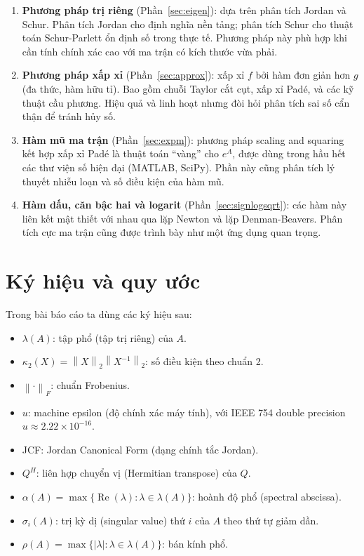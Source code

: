 \documentclass[12pt,a4paper]{report}
\newcommand{\norm}[1]{\left\lVert #1 \right\rVert}
\DeclareMathOperator{\re}{Re}
\begin{document}
\begin{enumerate}[label=\roman*.]
  \item \textbf{Phương pháp trị riêng} (Phần~\ref{sec:eigen}): dựa trên phân tích
    Jordan và Schur. Phân tích Jordan cho định nghĩa nền tảng; phân tích Schur
    cho thuật toán Schur-Parlett ổn định số trong thực tế. Phương pháp này phù hợp
    khi cần tính chính xác cao với ma trận có kích thước vừa phải.

  \item \textbf{Phương pháp xấp xỉ} (Phần~\ref{sec:approx}): xấp xỉ $f$ bởi hàm
    đơn giản hơn $g$ (đa thức, hàm hữu tỉ). Bao gồm chuỗi Taylor cắt cụt, xấp xỉ
    Padé, và các kỹ thuật cầu phương. Hiệu quả và linh hoạt nhưng đòi hỏi phân tích
    sai số cẩn thận để tránh hủy số.

  \item \textbf{Hàm mũ ma trận} (Phần~\ref{sec:expm}): phương pháp scaling and
    squaring kết hợp xấp xỉ Padé là thuật toán ``vàng'' cho $e^A$, được dùng trong
    hầu hết các thư viện số hiện đại (MATLAB, SciPy).
    Phần này cũng phân tích lý thuyết nhiễu loạn và số điều kiện của hàm mũ.

  \item \textbf{Hàm dấu, căn bậc hai và logarit} (Phần~\ref{sec:signlogsqrt}):
    các hàm này liên kết mật thiết với nhau qua lặp Newton và lặp Denman-Beavers.
    Phân tích cực ma trận cũng được trình bày như một ứng dụng quan trọng.
\end{enumerate}

\section*{Ký hiệu và quy ước}

Trong bài báo cáo ta dùng các ký hiệu sau:
\begin{itemize}
  \item $\lambda(A)$: tập phổ (tập trị riêng) của $A$.
  \item $\kappa_2(X) = \norm{X}_2 \norm{X^{-1}}_2$: số điều kiện theo chuẩn 2.
  \item $\norm{\cdot}_F$: chuẩn Frobenius.
  \item $u$: machine epsilon (độ chính xác máy tính), với IEEE 754 double precision
    $u \approx 2.22 \times 10^{-16}$.
  \item JCF: Jordan Canonical Form (dạng chính tắc Jordan).
  \item $Q^H$: liên hợp chuyển vị (Hermitian transpose) của $Q$.
  \item $\alpha(A) = \max\{\re(\lambda): \lambda \in \lambda(A)\}$: hoành độ phổ
    (spectral abscissa).
  \item $\sigma_i(A)$: trị kỳ dị (singular value) thứ $i$ của $A$ theo thứ tự giảm dần.
  \item $\rho(A) = \max\{|\lambda|: \lambda \in \lambda(A)\}$: bán kính phổ.
\end{itemize}
\end{document}

